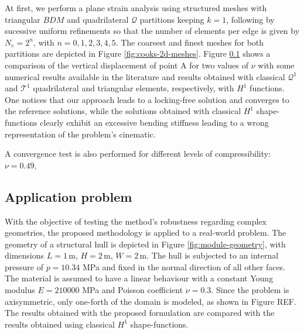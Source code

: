 \documentclass[english,11pt,3p,number,sort&compress]{elsarticle}
\newcommand{\m}{\,\text{m}}
\begin{document}
At first, we perform a plane strain analysis using structured meshes with triangular $BDM$ and quadrilateral $\mathcal{Q}$ partitions keeping $k=1$, following by sucessive uniform refinements so that the number of elements per edge is given by $N_e=2^n$, with $n={0,1,2,3,4,5}$. The coarsest and finest meshes for both partitions are depicted in Figure \ref{fig:cooks-2d-meshes}. Figure \ref{} shows a comparison of the vertical displacement of point A for two values of $\nu$ with some numerical results available in the literature \cite{elguedj2008b,cesar1999new} and results obtained with classical $\mathcal{Q}^1$ and $\mathcal{T}^1$ quadrilateral and triangular elements, respectively, with $H^1$ functions. One notices that our approach leads to a locking-free solution and converges to the reference solutions, while the solutions obtained with classical $H^1$ shape-functions clearly exhibit an excessive bending stiffness leading to a wrong representation of the problem's cinematic.


A convergence test is also performed for different levels of compressibility: $\nu=0.49,$

\subsection{Application problem\label{subsec:module}}

With the objective of testing the method's robustness regarding complex geometries, the proposed methodology is applied to a real-world problem. The geometry of a structural hull is depicted in Figure \ref{fig:module-geometry}, with dimensions $L=1\m$, $H=2\m$, $W=2\m$. The hull is subjected to an internal pressure of $p=10.34$ MPa and fixed in the normal direction of all other faces. The material is assumed to have a linear behaviour with a constant Young modulus $E=210000$ MPa and Poisson coefficient $\nu=0.3$. Since the problem is axisymmetric, only one-forth of the domain is modeled, as shown in Figure REF. The results obtained with the proposed formulation are compared with the results obtained using classical $H^1$ shape-functions.
\end{document}
